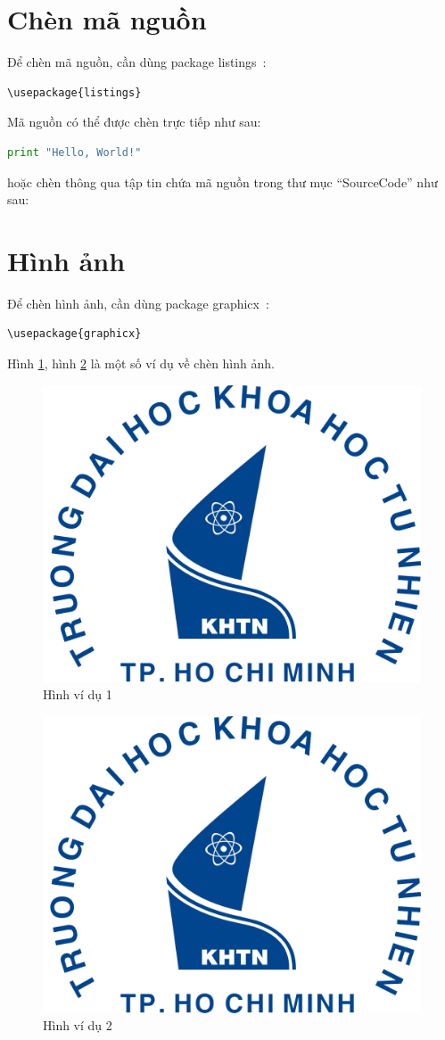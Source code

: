 \section{Chèn mã nguồn}

Để chèn mã nguồn, cần dùng package listings~\cite{Listings}:

\begin{lstlisting}
\usepackage{listings}
\end{lstlisting}

Mã nguồn có thể được chèn trực tiếp như sau:

\begin{lstlisting}[language=Python]
print "Hello, World!"
\end{lstlisting}

hoặc chèn thông qua tập tin chứa mã nguồn trong thư mục ``SourceCode'' như sau:



\section{Hình ảnh}

Để chèn hình ảnh, cần dùng package graphicx~\cite{Figures}:

\begin{lstlisting}
\usepackage{graphicx}
\end{lstlisting}

Hình \ref{fig:vd1}, hình \ref{fig:vd2} là một số ví dụ về chèn hình ảnh.

\begin{figure}[htp]
	\centering
	\includegraphics[width=6 cm]{images/logo-khtn}
	\caption{Hình ví dụ 1}
	\label{fig:vd1}
\end{figure}

\begin{figure}[htp]
	\centering
	\includegraphics[width=40 mm]{images/logo-khtn}
	\caption{Hình ví dụ 2}
	\label{fig:vd2}
\end{figure}

